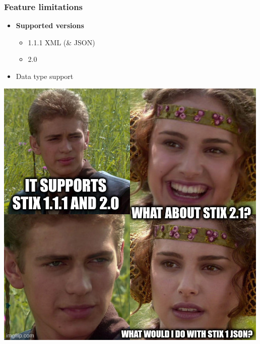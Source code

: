 \begin{frame}
    \frametitle{Feature limitations}
    \begin{minipage}{0.45\textwidth}
        \begin{itemize}
            \item {\bf Supported versions}
            \begin{itemize}
                \item 1.1.1 XML (\& JSON)
                \item 2.0
            \end{itemize}
            \item Data type support
        \end{itemize}
    \end{minipage}%
    \begin{minipage}{0.55\textwidth}
        \centering
        \includegraphics[width=\textwidth]{images/limited_version.jpg}
    \end{minipage}
\end{frame}

